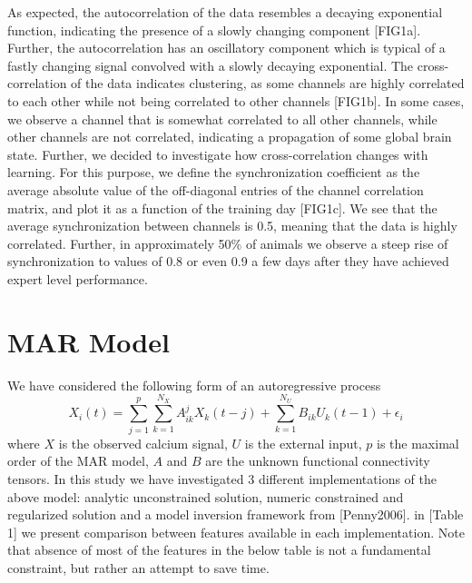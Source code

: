 \documentclass[a4paper,10pt]{article}
\begin{document}
As expected, the autocorrelation of the data resembles a decaying exponential function, indicating the presence of a slowly changing component [FIG1a]. Further, the autocorrelation has an oscillatory component which is typical of a fastly changing signal convolved with a slowly decaying exponential. The cross-correlation of the data indicates clustering, as some channels are highly correlated to each other while not being correlated  to other channels [FIG1b]. In some cases, we observe a channel that is somewhat correlated to all other channels, while other channels are not correlated, indicating a propagation of some global brain state. Further, we decided to investigate how cross-correlation changes with learning. For this purpose, we define the synchronization coefficient as the average absolute value of the off-diagonal entries of the channel correlation matrix, and plot it as a function of the training day [FIG1c]. We see that the average synchronization between channels is 0.5, meaning that the data is highly correlated. Further, in approximately 50\% of animals we observe a steep rise of synchronization to values of 0.8 or even 0.9 a few days after they have achieved expert level performance.

\section{MAR Model}

We have considered the following form of an autoregressive process
\begin{equation}
  X_i(t) = \sum_{j=1}^p \sum_{k=1}^{N_X}   A^j_{ik} X_k(t-j) + \sum_{k=1}^{N_U} B_{ik} U_k(t-1) + \epsilon_i 
\end{equation}
where $X$ is the observed calcium signal, $U$ is the external input, $p$ is the maximal order of the MAR model, $A$ and $B$ are the unknown functional connectivity tensors. In this study we have investigated 3 different implementations of the above model: analytic unconstrained solution, numeric constrained and regularized solution and a model inversion framework from [Penny2006]. in [Table 1] we present comparison between features available in each implementation. Note that absence of most of the features in the below table is not a fundamental constraint, but rather an attempt to save time.
\end{document}
